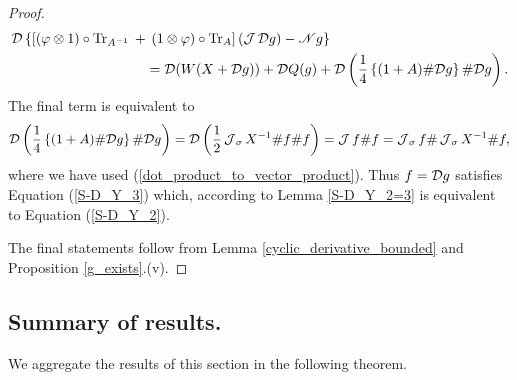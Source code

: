 \begin{proof}
\begin{align*}
		\mathcal D\left\{ \left[ (\varphi\otimes 1)\circ\text{Tr}_{A^{-1}} \right.\right.+&\left.\left. (1\otimes\varphi)\circ \text{Tr}_A\right](\operatorname{\mathcal J}\mathcal D g) - \mathscr{N} g\right\} \\
										&= \mathcal D(W(X+\mathcal D g))+\mathcal D Q(g)+ \mathcal D\left(\frac{1}{4}\left\{(1+A)\# \mathcal D g\right\}\# \mathcal D g\right).
	\end{align*}
The final term is equivalent to
	\begin{align*}
		\mathcal D\left(\frac{1}{4}\left\{(1+A)\# \mathcal D g\right\}\# \mathcal D g\right) = \mathcal D\left(\frac{1}{2} \operatorname{\mathcal J}_\sigma X^{-1}\# f\# f\right) = \operatorname{\mathcal J} f\# f=\operatorname{\mathcal J}_\sigma f\#\operatorname{\mathcal J}_\sigma X^{-1}\# f,
	\end{align*}
where we have used (\ref{dot_product_to_vector_product}). Thus $f=\mathcal D g$ satisfies Equation (\ref{S-D_Y_3}) which, according to Lemma \ref{S-D_Y_2=3} is equivalent to Equation (\ref{S-D_Y_2}).\par
The final statements follow from Lemma \ref{cyclic_derivative_bounded} and Proposition \ref{g_exists}.(v).
\end{proof}




\subsection{Summary of results.}\label{summary}

We aggregate the results of this section in the following theorem.

